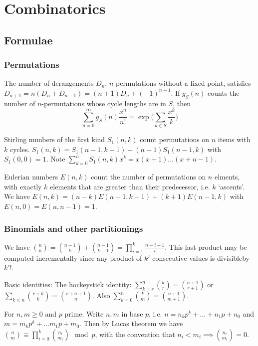 \documentclass[
	a4paper,
	landscape,
	10pt,
	article
]{article}
\begin{document}
\section{Combinatorics}

\subsection{Formulae}
\subsubsection*{Permutations}
The number of derangements $D_n$, $n$-permutations without a fixed point,
satisfies $D_{n+1} = n(D_n + D_{n-1}) = (n+1)D_n + (-1)^{n+1}$. If
$g_S(n)$ counts the number of $n$-permutations whose cycle lengths are in
$S$, then
		$$\sum_{n=0}^\infty g_S(n)\frac{x^n}{n!} = \exp\Big(\sum_{k\in S}
			\frac{x^k}{k}\Big)$$

Stirling numbers of the first kind $S_1(n, k)$ count permutations on $n$ items
with $k$ cycles. $S_1(n, k) = S_1(n-1, k-1) + (n-1)S_1(n-1, k)$ with
$S_1(0, 0) = 1$. Note $\sum_{k=0}^n S_1(n, k)x^k = x(x+1)\dots(x+n-1)$.

Eulerian numbers $E(n, k)$ count the number of permutations on $n$ elments,
with exactly $k$ elements that are greater than their predecessor, i.e.
$k$ `ascents'. We have $E(n, k) = (n-k)E(n-1,k-1)+(k+1)E(n-1,k)$ with
$E(n, 0) = E(n, n-1)=1$.

\subsubsection*{Binomials and other partitionings}
We have $\binom{n}{k} = \binom{n-1}{k}+\binom{n-1}{k-1} =
	\prod_{i=1}^k \frac{n-i+1}{i}$. This last product may be computed
incrementally since any product of $k'$ consecutive values is divisibleby
$k'!$.

Basic identities: The hockeystick identity: $\sum_{k=r}^n \binom{k}{r}
	= \binom{n+1}{r+1}$
or $\sum_{k\leq n}\binom{r+k}{k} = \binom{r+n+1}{n}$.
Also $\sum_{k=0}^n \binom{k}{m} = \binom{n+1}{m+1}$.

For $n, m \geq 0$ and $p$ prime. Write $n, m$ in base $p$, i.e.
$n = n_k p^k + \dots + n_1 p + n_0$ and $m = m_k p^k + \dots m_1 p + m_0$. Then
by Lucas theorem we have $\binom{n}{m} \equiv \prod_{i=0}^k \binom{n_i}{m_i}
	\mod p$, with the convention that $n_i < m_i \implies \binom{n_i}{m_i} =0$.


\end{document}
